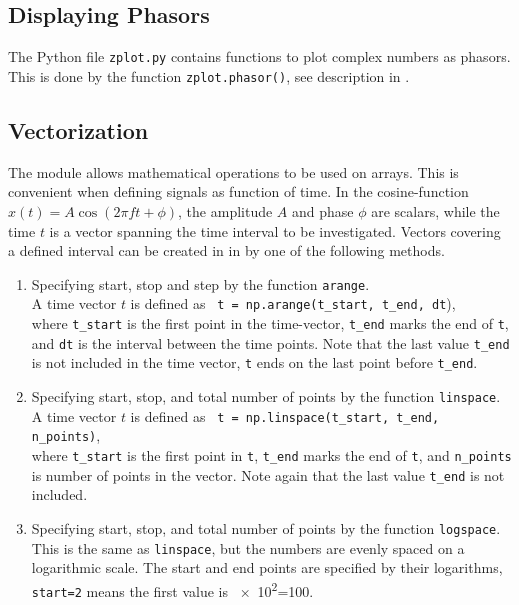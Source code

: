 

\subsection{Displaying Phasors}
The Python file \verb|zplot.py| contains functions to plot complex numbers as phasors. 
This is done by the function \verb|zplot.phasor()|, see description in .



\subsection{Vectorization}
The \numpy module allows mathematical operations to be used on arrays. This is convenient when defining signals as function of time. In the cosine-function $x(t)=A \cos(2\pi f t + \phi)$, the amplitude $A$ and phase $\phi$ are scalars, while the time $t$ is a vector spanning the time interval to be investigated. 
Vectors covering a defined interval can be created in in \numpy by one of the following methods.

\begin{enumerate}[1)]
	\item Specifying start, stop and step by the function \texttt{arange}. \\ 
	 A time vector $t$ is defined as 
	 \verb| t = np.arange(t_start, t_end, dt|), \\
	 where \verb|t_start| is the first point in the time-vector, \verb|t_end| marks the end of \verb|t|, and \verb|dt| is the interval between the time points. Note that the last value \verb|t_end| is not included in the time vector, \verb|t| ends on the last point before \verb|t_end|.
	 
	\item Specifying start, stop, and total number of points by the function \texttt{linspace}. \\
	A time vector $t$ is defined as \verb| t = np.linspace(t_start, t_end, n_points)|, \\
	where \verb|t_start| is the first point in \verb|t|, \verb|t_end| marks the end of \verb|t|, and \verb|n_points| is number of points in the vector. 
	Note again that the last value \verb|t_end| is not included.

	\item Specifying start, stop, and total number of points by the function \texttt{logspace}. \\ 
	This is the same as \verb|linspace|, but the numbers are evenly spaced on a logarithmic scale. The start and end points are specified by their logarithms, \verb|start=2| means the first value is \num{e2}=\num{100}.
\end{enumerate}
	
